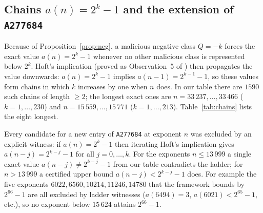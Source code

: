 \documentclass[11pt]{article}
\theoremstyle{remark}
\begin{document}
\subsection{Chains $a(n)=2^k-1$ and the extension of \texttt{A277684}}

Because of Proposition~\ref{prop:neg}, a malicious negative class $Q=-k$ forces the exact value
$a(n)=2^k-1$ whenever no other malicious class is represented below $2^k$. Hoft's implication
\cite{hoft} (proved as Observation~5 of \cite{frinkle2025:obs}) then propagates the value downwards:
$a(n)=2^k-1$ implies $a(n-1)=2^{k-1}-1$, so these values form chains in which $k$ increases by one when
$n$ does. In our table there are $1590$ such chains of length $\ge2$; the longest exact ones are
$n=33\,237,\dots,33\,466$ ($k=1,\dots,230$) and $n=15\,559,\dots,15\,771$ ($k=1,\dots,213$).
Table~\ref{tab:chains} lists the eight longest.

\begin{table}[ht]
\centering
\small
\caption{The eight longest certified chains $a(n)=2^k-1$ ($k$ increasing by 1 with $n$).}
\label{tab:chains}

\end{table}

\begin{table}[ht]
\centering
\small
\caption{Extension of \texttt{A277684} (least $n$ with $a(n)=2^k-1$). The published entries
($k\le65$) are reproduced; $k=66..230$ are new. Each new entry was certified by checking that every
smaller exponent is excluded, either by a smaller certified bound or by the iterated Hoft implication
(see text).}
\label{tab:a277684}

\end{table}

Every candidate for a new entry of \texttt{A277684} at exponent $n$ was excluded by an explicit
witness: if $a(n)=2^k-1$ then iterating Hoft's implication gives $a(n-j)=2^{k-j}-1$ for all
$j=0,\dots,k$. For the exponents $n\le13\,999$ a single exact value $a(n-j)\ne 2^{k-j}-1$ from our
table contradicts the ladder; for $n>13\,999$ a certified upper bound
$a(n-j)<2^{k-j}-1$ does. For example the five exponents $6022,6560,10214,11246,14780$ that the
framework bounds by $2^{66}-1$ are all excluded by ladder witnesses
($a(6494)=3$, $a(6021)<2^{65}-1$, etc.), so no exponent below $15\,624$ attains $2^{66}-1$.
\end{document}
